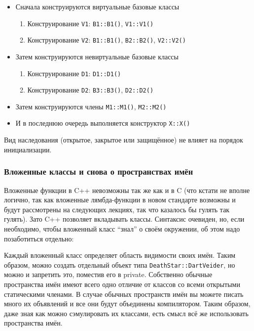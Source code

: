 \documentclass[a4paper,12pt,oneside]{article}
\begin{document}
\begin{itemize}
\item Сначала конструируются виртуальные базовые классы
  \begin{enumerate}
  \item Конструирование \lstinline!V1!: \lstinline!B1::B1()!, \lstinline!V1::V1()!
  \item Конструирование \lstinline!V2!: \lstinline!B1::B1()!, \lstinline!B2::B2()!, \lstinline!V2::V2()!
  \end{enumerate}
\item Затем конструируются невиртуальные базовые классы
  \begin{enumerate}
  \item Конструирование \lstinline!D1!: \lstinline!D1::D1()!
  \item Конструирование \lstinline!D2!: \lstinline!B3::B3()!, \lstinline!D2::D2()!
  \end{enumerate}
\item Затем конструируются члены \lstinline!M1::M1()!, \lstinline!M2::M2()!
\item И в последнюю очередь выполняется конструктор \lstinline!X::X()!
\end{itemize}

Вид наследования (открытое, закрытое или защищённое) не влияет на порядок инициализации.

\subsubsection{Вложенные классы и снова о пространствах имён}

Вложенные функции в C++ невозможны так же как и в C (что кстати не вполне логично, так как вложенные лямбда-функции в новом стандарте возможны и будут рассмотрены на следующих лекциях, так что казалось бы гулять так гулять). Зато C++ позволяет вкладывать классы. Синтаксис очевиден, но, если необходимо, чтобы вложенный класс ``знал'' о своём окружении, об этом надо позаботиться отдельно:



Каждый вложенный класс определяет область видимости своих имён. Таким образом, можно создать отдельный объект типа \lstinline!DeathStar::DartVeider!, но можно и запретить это, поместив его в private. Собственно обычные пространства имён имеют всего одно отличие от классов со всеми открытыми статическими членами. В случае обычных пространств имён вы можете писать много их объявлений и все они будут объединены компилятором. Таким образом, даже зная как можно сэмулировать их классами, есть смысл всё же использовать пространства имён.
\end{document}
